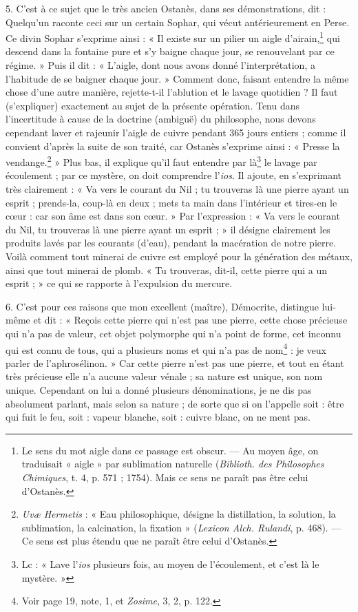 \documentclass[landscape, a4paper, 11pt, oneside, polutonikogreek, french]{article}
\begin{document}
5. C'est à ce sujet que le très ancien Ostanès, dans ses démonstrations, dit : Quelqu'un raconte ceci sur un certain Sophar, qui vécut antérieurement en Perse. Ce divin Sophar s'exprime ainsi : « Il existe sur un pilier un aigle d'airain,\footnote{Le sens du mot aigle dans ce passage est obscur. --- Au moyen âge, on traduisait « aigle » par sublimation naturelle (\emph{Biblioth. des Philosophes Chimiques}, t. 4, p. 571 ; 1754). Mais ce sens ne paraît pas être celui d'Ostanès.} qui descend dans la fontaine pure et s'y baigne chaque jour, se renouvelant par ce régime. » Puis il dit : « L'aigle, dont nous avons donné l'interprétation, a l'habitude de se baigner chaque jour. » Comment donc, faisant entendre la même chose d'une autre manière, rejette-t-il l'ablution et le lavage quotidien ? Il faut (s'expliquer) exactement au sujet de la présente opération. Tenu dans l'incertitude à cause de la doctrine (ambiguë) du philosophe, nous devons cependant laver et rajeunir l'aigle de cuivre pendant 365 jours entiers ; comme il convient d'après la suite de son traité, car Ostanès s'exprime ainsi : « Presse la vendange.\footnote{\emph{Uvæ Hermetis} : « Eau philosophique, désigne la distillation, la solution, la sublimation, la calcination, la fixation » (\emph{Lexicon Alch. Rulandi}, p. 468). --- Ce sens est plus étendu que ne paraît être celui d'Ostanès.} » Plus bas, il explique qu'il faut entendre par là\footnote{Lc : « Lave l'\emph{ios} plusieurs fois, au moyen de l'écoulement, et c'est là le mystère. »} le lavage par écoulement ; par ce mystère, on doit comprendre l'\emph{ios}. Il ajoute, en s'exprimant très clairement : « Va vers le courant du Nil ; tu trouveras là une pierre ayant un esprit ; prends-la, coup-là en deux ; mets ta main dans l'intérieur et tires-en le cœur : car son âme est dans son cœur. » Par l'expression : « Va vers le courant du Nil, tu trouveras là une pierre ayant un esprit ; » il désigne clairement les produits lavés par les courants (d'eau), pendant la macération de notre pierre. Voilà comment tout minerai de cuivre est employé pour la génération des métaux, ainsi que tout minerai de plomb. « Tu trouveras, dit-il, cette pierre qui a un esprit ; » ce qui se rapporte à l'expulsion du mercure.

6. C'est pour ces raisons que mon excellent (maître), Démocrite, distingue lui-même et dit : « Reçois cette pierre qui n'est pas une pierre, cette chose précieuse qui n'a pas de valeur, cet objet polymorphe qui n'a point de forme, cet inconnu qui est connu de tous, qui a plusieurs noms et qui n'a pas de nom\footnote{Voir page 19, note, 1, et \emph{Zosime}, 3, 2, p. 122.} : je veux parler de l'aphrosélinon. » Car cette pierre n'est pas une pierre, et tout en étant très précieuse elle n'a aucune valeur vénale ; sa nature est unique, son nom unique. Cependant on lui a donné plusieurs dénominations, je ne dis pas absolument parlant, mais selon sa nature ; de sorte que si on l'appelle soit : être qui fuit le feu, soit : vapeur blanche, soit : cuivre blanc, on ne ment pas.
\end{document}
